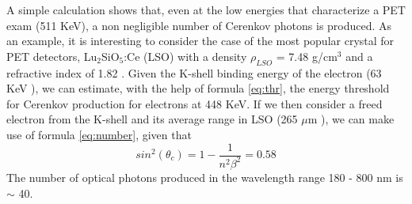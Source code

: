 A simple calculation shows that, even at the low energies that characterize a PET exam (511 KeV), a non negligible number of Cerenkov photons is produced.
As an example, it is interesting to consider the case of the most popular crystal for PET detectors, Lu$_{2}$SiO$_{5}$:Ce (LSO) with a density $\rho _{LSO}$ = 7.48 g/cm$^{3}$ and a refractive index of 1.82 \cite{jellison2012}.
Given the K-shell binding energy of the electron (63 KeV \cite{xdata2009}), we can estimate, with the help of formula  \ref{eq:thr}, the energy threshold for Cerenkov production for electrons at 448 KeV.
If we then consider a freed electron from the K-shell and its average range in LSO (265 $\mu$m \cite{nist2005}), we can make use of formula \ref{eq:number}, given that
\begin{equation}
sin ^{2}(\theta _{c}) = 1 - \frac{1}{n^{2}\beta ^{2}} = 0.58
\end{equation}
The number of optical photons produced in the wavelength range 180 - 800 nm is $\sim$ 40.


